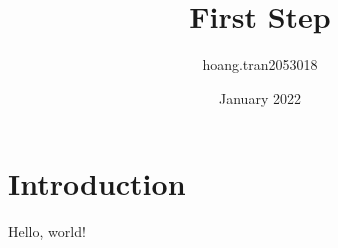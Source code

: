 \documentclass{article}
\title{First Step}
\author{hoang.tran2053018 }
\date{January 2022}
\begin{document}
\maketitle

\section{Introduction}
Hello, world!
\end{document}
